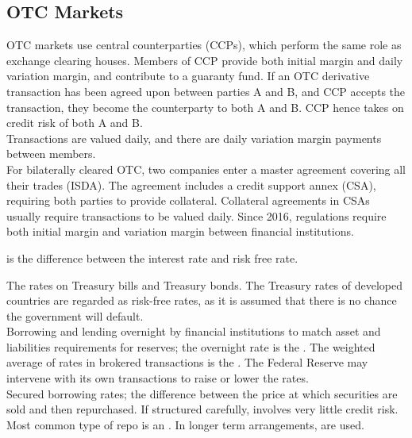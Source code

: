 \subsection{OTC Markets}

OTC markets use central counterparties (CCPs), which perform the same role as exchange clearing houses. Members of CCP provide both initial margin and daily variation margin, and contribute to a guaranty fund. If an OTC derivative transaction has been agreed upon between parties A and B, and CCP accepts the transaction, they become the counterparty to both A and B. CCP hence takes on credit risk of both A and B.\\
Transactions are valued daily, and there are daily variation margin payments between members.\\

For bilaterally cleared OTC, two companies enter a master agreement covering all their trades (ISDA). The agreement includes a credit support annex (CSA), requiring both parties to provide collateral. Collateral agreements in CSAs usually require transactions to be valued daily. Since 2016, regulations require both initial margin and variation margin between financial institutions.

\begin{definition}  is the difference between the interest rate and risk free rate.
\end{definition}

 The rates on Treasury bills and Treasury bonds. The Treasury rates of developed countries are regarded as risk-free rates, as it is assumed that there is no chance the government will default.\\

 Borrowing and lending overnight by financial institutions to match asset and liabilities requirements for reserves; the overnight rate is the . The weighted average of rates in brokered transactions is the . The Federal Reserve may intervene with its own transactions to raise or lower the rates.\\

 Secured borrowing rates; the difference between the price at which securities are sold and then repurchased. If structured carefully, involves very little credit risk. Most common type of repo is an . In longer term arrangements,  are used.\\

